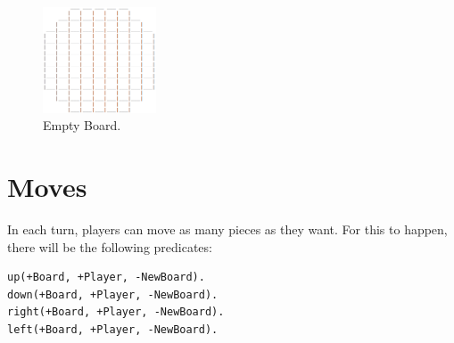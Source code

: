 \documentclass[a4paper]{article}
\begin{document}
\begin{figure}[h!]
	\centering
	\includegraphics[width=0.3\textwidth]{Board.png}
	\caption{Empty Board.}
	\label{Image: board}
\end{figure}


\section{Moves}

In each turn, players can move as many pieces as they want. For this to happen, there will be the following predicates:

\begin{lstlisting}
up(+Board, +Player, -NewBoard).
down(+Board, +Player, -NewBoard).
right(+Board, +Player, -NewBoard).
left(+Board, +Player, -NewBoard).
\end{lstlisting}

\end{document}
